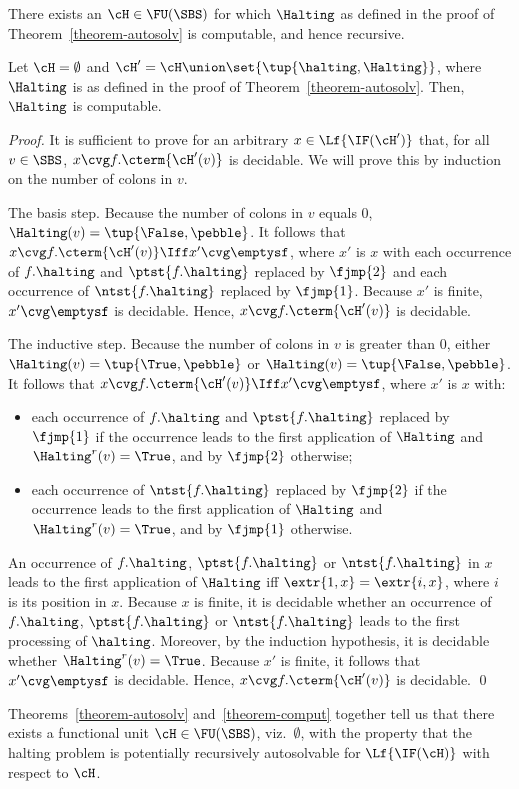 \documentclass[fleqn]{llncs}
\begin{document}
There exists an $\cH \in \FU(\SBS)$ for which $\Halting$ as defined in
the proof of Theorem~\ref{theorem-autosolv} is computable, and hence
recursive.
\begin{theorem}
\label{theorem-comput}
Let $\cH = \emptyset$ and
$\cH' = \cH \union \set{\tup{\halting,\Halting}}$, where
$\Halting$ is as defined in the proof
of Theorem~\ref{theorem-autosolv}.
Then, $\Halting$ is computable.
\end{theorem}
\begin{proof}
It is sufficient to prove for an arbitrary $x \in \Lf{\IF(\cH')}$ that,
for all $v \in \SBS$, $x \cvg f.\cterm{\cH'(v)}$ is decidable.
We will prove this by induction on the number of colons in $v$.

The basis step.
Because the number of colons in $v$ equals $0$,
$\Halting(v) = \tup{\False,\pebble}$.
It follows that $x \cvg f.\cterm{\cH'(v)} \Iff x' \cvg \emptysf$,
where $x'$ is $x$ with each occurrence of $f.\halting$ and
$\ptst{f.\halting}$ replaced by $\fjmp{2}$ and each occurrence of
$\ntst{f.\halting}$ replaced by $\fjmp{1}$.
Because $x'$ is finite, $x' \cvg \emptysf$ is decidable.
Hence, $x \cvg f.\cterm{\cH'(v)}$ is decidable.

The inductive step.
Because the number of colons in $v$ is greater than $0$, either
$\Halting(v) = \tup{\True,\pebble}$ or
$\Halting(v) = \tup{\False,\pebble}$.
It follows that $x \cvg f.\cterm{\cH'(v)} \Iff x' \cvg \emptysf$, where
$x'$ is $x$ with:
\begin{itemize}
\item
each occurrence of $f.\halting$ and $\ptst{f.\halting}$ replaced by
$\fjmp{1}$ if the occurrence leads to the first application of
$\Halting$ and $\Halting^r(v) = \True$, and by $\fjmp{2}$ otherwise;
\item
each occurrence of $\ntst{f.\halting}$ replaced by
$\fjmp{2}$ if the occurrence leads to the first application of
$\Halting$ and $\Halting^r(v) = \True$, and by $\fjmp{1}$ otherwise.
\end{itemize}
An occurrence of $f.\halting$, $\ptst{f.\halting}$ or
$\ntst{f.\halting}$ in $x$ leads to the first application of $\Halting$
iff $\extr{1,x} = \extr{i,x}$, where $i$ is its position in $x$.
Because $x$ is finite, it is decidable whether an occurrence of
$f.\halting$, $\ptst{f.\halting}$ or $\ntst{f.\halting}$ leads to the
first processing of $\halting$.
Moreover, by the induction hypothesis, it is decidable whether
$\Halting^r(v) = \True$.
Because $x'$ is finite, it follows that $x' \cvg \emptysf$ is decidable.
Hence, $x \cvg f.\cterm{\cH'(v)}$ is decidable.
\qed
\end{proof}
Theorems~\ref{theorem-autosolv} and~\ref{theorem-comput} together tell
us that there exists a functional unit $\cH \in \FU(\SBS)$, viz.\
$\emptyset$, with the property that the halting problem is potentially
recursively autosolvable for $\Lf{\IF(\cH)}$ with respect to $\cH$.
\end{document}
